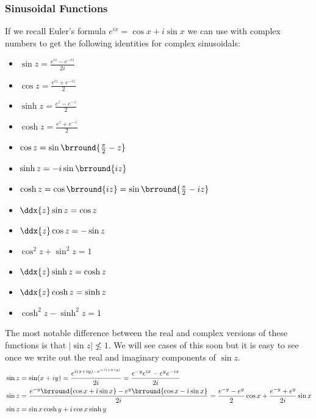 \subsubsection{Sinusoidal Functions}
If we recall Euler's formula $e^{ix}=\cos x+i\sin x$ we can use with complex numbers to get the following identities for complex sinusoidals:
\begin{itemize}
    \item $\sin z=\frac{e^{iz}-e^{-iz}}{2i}$
    \item $\cos z=\frac{e^{iz}+e^{-iz}}{2}$
    \item $\sinh z=\frac{e^z-e^{-z}}{2}$
    \item $\cosh z=\frac{e^z+e^{-z}}{2}$
    \item $\cos z=\sin\brround{\tfrac{\pi}{2}-z}$
    \item $\sinh z=-i\sin\brround{iz}$
    \item $\cosh z=\cos\brround{iz}=\sin\brround{\tfrac{\pi}{2}-iz}$
    \item $\ddx{z}\sin z=\cos z$
    \item $\ddx{z}\cos z=-\sin z$
    \item $\cos^2z+\sin^2z=1$
    \item $\ddx{z}\sinh z=\cosh z$
    \item $\ddx{z}\cosh z=\sinh z$
    \item $\cosh^2z-\sinh^2z=1$
\end{itemize}
The most notable difference between the real and complex versions of these functions is that $|\sin z|\not\leq1$. We will see cases of this soon but it is easy to see once we write out the real and imaginary components of $\sin z$.
\begin{align*}
    &\sin z=\sin(x+iy)=\frac{e^{i(x+iy)-e^{-i(x+iy)}}}{2i}=\frac{e^{-y}e^{ix}-e^ye^{-ix}}{2i}\\
    &\sin z = \frac{e^{-y}\brround{\cos x+i\sin x}-e^y\brround{\cos x-i\sin x}}{2i}=\frac{e^{-y}-e^y}{2}\cos x+\frac{e^{-y}+e^y}{2i}\sin x\\
    &\sin z = \sin x\cosh y+i\cos x\sinh y
\end{align*}